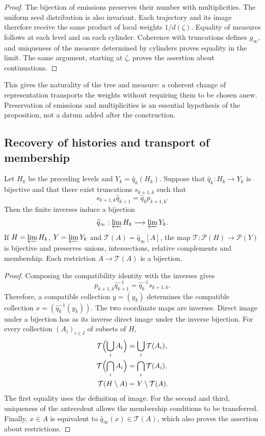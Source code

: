 \begin{proof}
The bijection of emissions preserves their number with multiplicities. The
uniform seed distribution is also invariant. Each trajectory
and its image therefore receive the same product of local weights
\(1/d(\zeta)\). Equality of measures follows at each level and on
each cylinder. Coherence with truncations defines \(g_\infty\),
and uniqueness of the measure determined by cylinders proves equality
in the limit. The same argument, starting at \(\zeta\), proves the
assertion about continuations.
\end{proof}

This gives the naturality of the tree and measure: a coherent change
of representation transports the weights without requiring them to be chosen anew.
Preservation of emissions and multiplicities is an essential hypothesis of
the proposition, not a datum added after the construction.

\subsection{Recovery of histories and transport of membership}
\begin{proposition}
\label{lib07:prop-familias}
Let \(H_k\) be the preceding levels and \(Y_k=\widehat q_k(H_k)\).
Suppose that \(\widehat q_k:H_k\to Y_k\) is bijective and that there exist
truncations \(s_{k+1,k}\) such that
\[
 s_{k+1,k}\widehat q_{k+1}=\widehat q_k p_{k+1,k}.
\]
Then the finite inverses induce a bijection
\[
 \widehat q_\infty:\varprojlim H_k\longrightarrow\varprojlim Y_k.
\]
If \(H=\varprojlim H_k\), \(Y=\varprojlim Y_k\) and
\(\mathcal T(A)=\widehat q_\infty[A]\), the map
\(\mathcal T:\mathcal P(H)\to\mathcal P(Y)\) is bijective and
preserves unions, intersections, relative complements and membership.
Each restriction \(A\to\mathcal T(A)\) is a bijection.
\end{proposition}
\begin{proof}
Composing the compatibility identity with the inverses gives
\[
 p_{k+1,k}\widehat q_{k+1}^{-1}
   =\widehat q_k^{-1}s_{k+1,k}.
\]
Therefore, a compatible collection \(y=(y_k)\) determines the compatible
collection \(x=(\widehat q_k^{-1}(y_k))\). The two coordinate
maps are inverses. Direct image under a bijection has
as its inverse direct image under the inverse bijection. For every
collection \((A_i)_{i\in I}\) of subsets of \(H\),
\[
 \begin{aligned}
 \mathcal T\Bigl(\bigcup_i A_i\Bigr)&=\bigcup_i\mathcal T(A_i),\\
 \mathcal T\Bigl(\bigcap_i A_i\Bigr)&=\bigcap_i\mathcal T(A_i),\\
 \mathcal T(H\setminus A)&=Y\setminus\mathcal T(A).
 \end{aligned}
\]
The first equality uses the definition of image. For the second and
third, uniqueness of the antecedent allows the membership
conditions to be transferred. Finally,
\(x\in A\) is equivalent to
\(\widehat q_\infty(x)\in\mathcal T(A)\), which also proves
the assertion about restrictions.
\end{proof}

